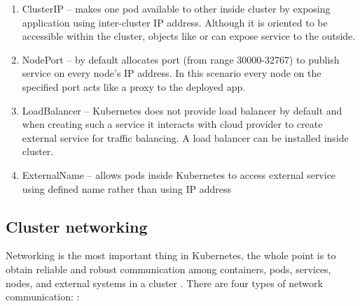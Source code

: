 \begin{enumerate}
    \item ClusterIP -- makes one pod available to other inside cluster by exposing application using inter-cluster IP address. Although it is oriented to be accessible within the cluster, objects like \textit{} or \textit{} can expose service to the outside.
    \item NodePort -- by default allocates port (from range 30000-32767) to publish service on every node's IP address. In this scenario every node on the specified port acts like a proxy to the deployed app.
    \item LoadBalancer -- Kubernetes does not provide load balancer by default and when creating such a service it interacts with cloud provider to create external service for traffic balancing. A load balancer can be installed inside cluster.
    \item ExternalName -- allows pods inside Kubernetes to access external service using defined name rather than using IP address 
\end{enumerate}




\subsection{Cluster networking}
\label{sec:k8s_networking}

Networking is the most important thing in Kubernetes, the whole point is to obtain reliable and robust communication among containers, pods, services, nodes, and external systems in a cluster \cite{KubernetesClusterNetworking}. There are four types of network communication: \cite{KubernetesClusterNetworking}:

